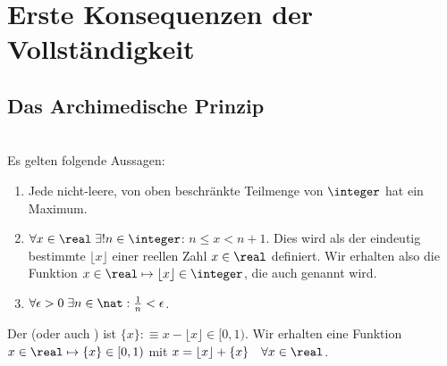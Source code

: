 \section{Erste Konsequenzen der Vollständigkeit}

\subsection{Das Archimedische Prinzip}

\begin{thm}
  \label{thm: das archimedische prinzip}
  \phantom{.} \\
  Es gelten folgende Aussagen:
  \begin{enumerate}
    \item Jede nicht-leere, von oben beschränkte Teilmenge von $\integer$ hat ein Maximum.
    \item $\forall x \in \real \; \exists! n \in \integer$: $n \leq x < n+1$. Dies wird als der eindeutig bestimmte  $\lfloor x \rfloor$ einer reellen Zahl $x \in \real$ definiert. Wir erhalten also die Funktion $x \in \real \mapsto \lfloor x \rfloor \in \integer$, die auch  genannt wird.
    \item $\forall \epsilon > 0 \; \exists n \in \nat: \frac{1}{n} < \epsilon$.
  \end{enumerate}
\end{thm}

Der  (oder auch ) ist $\{ x\} :\equiv x - \lfloor x \rfloor \in [0,1)$. Wir erhalten eine Funktion $x \in \real \mapsto \{ x\} \in [0, 1)$ mit $x=\lfloor x \rfloor + \{ x\} \quad \forall x \in \real$.

